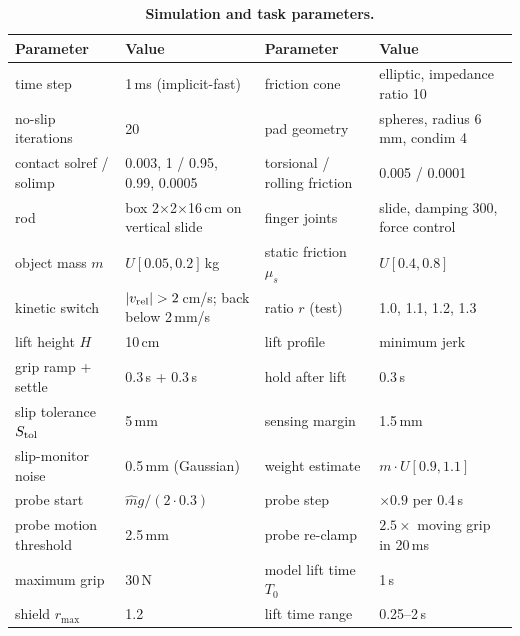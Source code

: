 \begin{table}[!htbp]\centering\small
\caption{\textbf{Simulation and task parameters.}}\label{tab:params}
\begin{tabular}{@{}llll@{}}\toprule
Parameter & Value & Parameter & Value\\\midrule
time step & 1\,ms (implicit-fast) & friction cone & elliptic, impedance ratio 10\\
no-slip iterations & 20 & pad geometry & spheres, radius 6\,mm, condim 4\\
contact solref / solimp & 0.003, 1 / 0.95, 0.99, 0.0005 & torsional / rolling friction & 0.005 / 0.0001\\
rod & box 2$\times$2$\times$16\,cm on vertical slide & finger joints & slide, damping 300, force control\\
object mass $m$ & $U[0.05,0.2]$\,kg & static friction $\mu_s$ & $U[0.4,0.8]$\\
kinetic switch & $|v_{\rm rel}|>2$\,cm/s; back below 2\,mm/s & ratio $r$ (test) & 1.0, 1.1, 1.2, 1.3\\
lift height $H$ & 10\,cm & lift profile & minimum jerk\\
grip ramp + settle & 0.3\,s + 0.3\,s & hold after lift & 0.3\,s\\
slip tolerance $S_{\rm tol}$ & 5\,mm & sensing margin & 1.5\,mm\\
slip-monitor noise & 0.5\,mm (Gaussian) & weight estimate & $m\cdot U[0.9,1.1]$\\
probe start & $\hat mg/(2\cdot0.3)$ & probe step & $\times0.9$ per 0.4\,s\\
probe motion threshold & 2.5\,mm & probe re-clamp & $2.5\times$ moving grip in 20\,ms\\
maximum grip & 30\,N & model lift time $T_0$ & 1\,s\\
shield $r_{\max}$ & 1.2 & lift time range & 0.25--2\,s\\\bottomrule
\end{tabular}\end{table}

